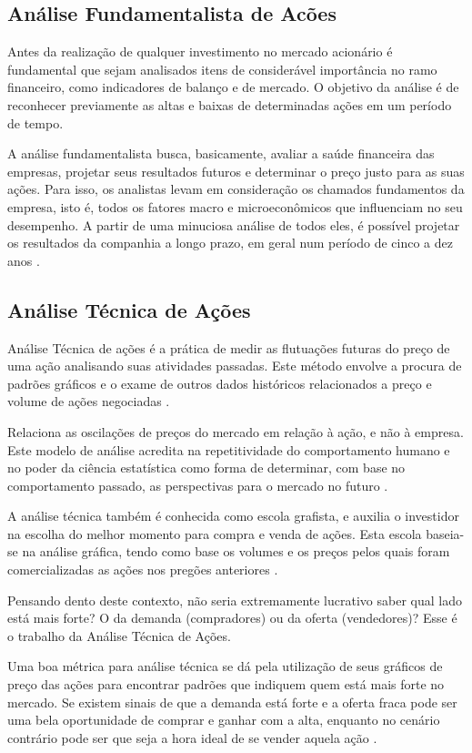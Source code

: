 \subsection{Análise Fundamentalista de Acões}
Antes da realização de qualquer investimento no mercado acionário é fundamental que sejam analisados itens de considerável importância no ramo financeiro, como indicadores de balanço e de mercado. O objetivo da análise é de reconhecer previamente as altas e baixas de determinadas ações em um período de tempo.

A análise fundamentalista busca, basicamente, avaliar a saúde financeira das empresas, projetar seus resultados futuros e determinar o preço justo para as suas ações. Para isso, os analistas levam em consideração os chamados fundamentos da empresa, isto é, todos os fatores macro e microeconômicos que influenciam no seu desempenho. A partir de uma minuciosa análise de todos eles, é possível projetar os resultados da companhia a longo prazo, em geral num período de cinco a dez anos \cite{exame}.

\subsection{Análise Técnica de Ações}\label{ch:analise-tecnica}
Análise Técnica de ações é a prática de medir as flutuações futuras do preço de uma ação analisando suas atividades passadas. Este método envolve a procura de padrões gráficos e o exame de outros dados históricos relacionados a preço e volume de ações negociadas \cite{tororadar}.
 
Relaciona as oscilações de preços do mercado em relação à ação, e não à empresa. Este modelo de análise acredita na repetitividade do comportamento humano e no poder da ciência estatística como forma de determinar, com base no comportamento passado, as perspectivas para o mercado no futuro \cite{pereira}.

A análise técnica também é conhecida como escola grafista, e auxilia o investidor na escolha do melhor momento para compra e venda de ações. Esta escola baseia-se na análise gráfica, tendo como base os volumes e os preços pelos quais foram comercializadas as ações nos pregões anteriores \cite{fortuna}.

Pensando dento deste contexto, não seria extremamente lucrativo saber qual lado está mais forte? O da demanda (compradores) ou da oferta (vendedores)? Esse é o trabalho da Análise Técnica de Ações.

Uma boa métrica para análise técnica se dá pela utilização de seus gráficos de preço das ações para encontrar padrões que indiquem quem está mais forte no mercado. Se existem sinais de que a demanda está forte e a oferta fraca pode ser uma bela oportunidade de comprar e ganhar com a alta, enquanto no cenário contrário pode ser que seja a hora ideal de se vender aquela ação \cite{tororadar}.

